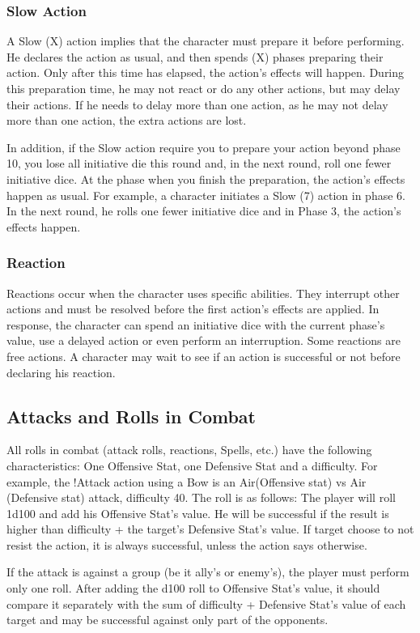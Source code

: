 \subsubsection{Slow Action}
A Slow (X) action implies that the
character must prepare it before performing. He
declares the action as usual, and then spends (X)
phases preparing their action. Only after this time
has elapsed, the action’s effects will happen.
During this preparation time, he may not react or
do any other actions, but may delay their actions.
If he needs to delay more than one action, as he
may not delay more than one action, the extra
actions are lost.

In addition, if the Slow action require you
to prepare your action beyond phase 10, you lose
all initiative die this round and, in the next round,
roll one fewer initiative dice. At the phase when
you finish the preparation, the action’s effects
happen as usual. For example, a character initiates
a Slow (7) action in phase 6. In the next round, he
rolls one fewer initiative dice and in Phase 3, the
action’s effects happen.

\subsubsection{Reaction}
Reactions occur when the character uses
specific abilities. They interrupt other actions and
must be resolved before the first action’s effects
are applied. In response, the character can spend
an initiative dice with the current phase’s value,
use a delayed action or even perform an
interruption. Some reactions are free actions. A
character may wait to see if an action is successful
or not before declaring his reaction.

\subsection{Attacks and Rolls in Combat}
All rolls in combat (attack rolls, reactions,
Spells, etc.) have the following characteristics: One
Offensive Stat, one Defensive Stat and a difficulty.
For example, the !Attack action using a Bow is an
Air(Offensive stat) vs Air (Defensive stat) attack,
difficulty 40. The roll is as follows: The player will
roll 1d100 and add his Offensive Stat’s value. He
will be successful if the result is higher than
difficulty + the target’s Defensive Stat’s value. If
target choose to not resist the action, it is always
successful, unless the action says otherwise.

If the attack is against a group (be it ally’s
or enemy’s), the player must perform only one roll.
After adding the d100 roll to Offensive Stat’s value,
it should compare it separately with the sum of
difficulty + Defensive Stat’s value of each target
and may be successful against only part of the
opponents.

